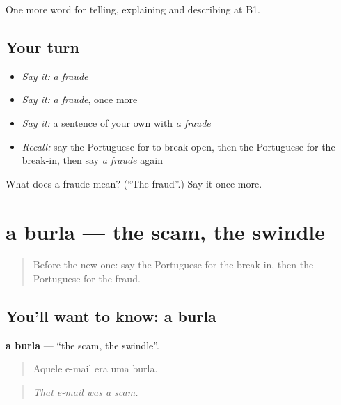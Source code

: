 \begin{grammarlens}[title={What you've built}]
One more word for telling, explaining and describing at B1.
\end{grammarlens}

\subsection*{Your turn}
\begin{itemize}
\raggedright
  \item \emph{Say it:} \emph{a fraude}
  \item \emph{Say it:} \emph{a fraude}, once more
  \item \emph{Say it:} a sentence of your own with \emph{a fraude}
  \item \emph{Recall:} say the Portuguese for to break open, then the Portuguese for the break-in, then say \emph{a fraude} again
\end{itemize}

\begin{tcolorbox}[breakable,colback=teal!4,colframe=teal!35!black,title={Before you move on}]
What does a fraude mean? (\textquotedblleft{}The fraud\textquotedblright{}.) Say it once more.
\end{tcolorbox}
\section[a burla]{a burla — the scam, the swindle}

\label{lesson:PT-C289-burla}



\begin{quote}
Before the new one: say the Portuguese for the break-in, then the Portuguese for the fraud.
\end{quote}

\subsection*{You'll want to know: a burla}
\textbf{a burla} — \textquotedblleft{}the scam, the swindle\textquotedblright{}.

\begin{quote}
Aquele e-mail era uma burla.
\end{quote}

\begin{quote}
\emph{That e-mail was a scam.}
\end{quote}

